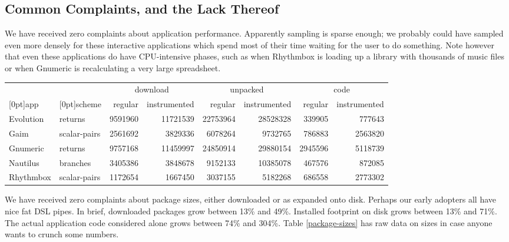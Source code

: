 \documentclass[times,10pt,twocolumn]{article}
\begin{document}
\subsection{Common Complaints, and the Lack Thereof}

We have received zero complaints about application performance.
Apparently  sampling is sparse enough; we probably
could have sampled even more densely for these interactive
applications which spend most of their time waiting for the user to do
something.  Note however that even these applications do have
CPU-intensive phases, such as when Rhythmbox is loading up a library
with thousands of music files or when Gnumeric is recalculating a very
large spreadsheet.

\begin{table*}
  \centering
  \begin{tabular}{|l|l|rr|rr|rr|}
    & & \multicolumn{2}{c|}{download} & \multicolumn{2}{c|}{unpacked} & \multicolumn{2}{c|}{code} \\
    \raisebox{1.5ex}[0pt]{app} & \raisebox{1.5ex}[0pt]{scheme} & regular & instrumented & regular & instrumented & regular & instrumented \\ \hline
    Evolution & returns & 9591960 & 11721539 & 22753964 & 28528328 & 339905 & 777643 \\
    Gaim & scalar-pairs & 2561692 & 3829336 & 6078264 & 9732765 & 786883 & 2563820 \\
    Gnumeric & returns & 9757168 & 11459997 & 24850914 & 29880154 & 2945596 & 5118739 \\
    Nautilus & branches & 3405386 & 3848678 & 9152133 & 10385078 & 467576 & 872085 \\
    Rhythmbox & scalar-pairs & 1172654 & 1667450 & 3037155 & 5182268 & 686558 & 2773302
  \end{tabular}
  \caption{Sizes of regular and instrumented packages.  Sizes are in
    bytes.  ``Download'' is the size of the complete RPM package,
    whose contents are compressed.  ``Unpacked'' is the size as
    installed on disk, without that compression. ``Code'' is just the
    size of the code for the main instrumented executable.}
  \label{package-sizes}
\end{table*}

We have received zero complaints about package sizes, either
downloaded or as expanded onto disk.  Perhaps our early adopters all
have nice fat DSL pipes.  In brief, downloaded packages grow between
13\% and 49\%.  Installed footprint on disk grows between 13\% and
71\%.  The actual application code considered alone grows between 74\%
and 304\%.  Table \ref{package-sizes} has raw data on sizes in case
anyone wants to crunch some numbers.
\end{document}
